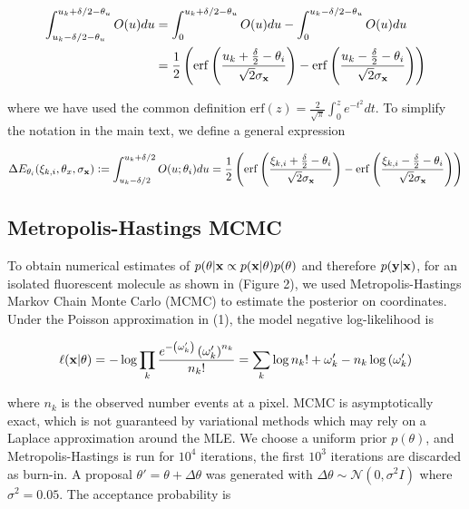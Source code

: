 \documentclass{article}
\begin{document}
\begin{align*}
\int_{u_{k}-\delta /2 - \theta_{u}}^{u_{k}+\delta /2 - \theta_{u}} O(u)du &= \int_{0}^{u_{k}+\delta /2 - \theta_{u}} O(u)du - \int_{0}^{u_{k}-\delta /2 - \theta_{u}} O(u)du\\
&= \frac{1}{2}\left(\mathrm{erf}\left(\frac{u_{k}+\frac{\delta}{2}-\theta_{i}}{\sqrt{2}\sigma_{\bold{x}}}\right) -\mathrm{erf}\left(\frac{u_{k}-\frac{\delta}{2}-\theta_{i}}{\sqrt{2}\sigma_{\bold{x}}}\right)\right)
\end{align*}

where we have used the common definition $\mathrm{erf}(z) = \frac{2}{\sqrt{\pi}}\int_{0}^{z}e^{-t^{2}}dt$. To simplify the notation in the main text, we define a general expression

\begin{equation*}
\Delta E_{\theta_{i}}(\xi_{k,i},\theta_{x},\sigma_{\bold{x}}) \vcentcolon = \int_{u_{k}-\delta /2}^{u_{k}+\delta /2} O(u;\theta_{i})du = \frac{1}{2}\left(\mathrm{erf}\left(\frac{\xi_{k,i}+\frac{\delta}{2}-\theta_{i}}{\sqrt{2}\sigma_{\bold{x}}}\right) -\mathrm{erf}\left(\frac{\xi_{k,i}-\frac{\delta}{2}-\theta_{i}}{\sqrt{2}\sigma_{\bold{x}}}\right)\right)
\end{equation*}

\subsection{Metropolis-Hastings MCMC}

To obtain numerical estimates of $p(\theta|\bold{x}\propto p(\bold{x}|\theta)p(\theta)$ and therefore $p(\bold{y}|\bold{x})$, for an isolated fluorescent molecule as shown in (Figure 2), we used Metropolis-Hastings Markov Chain Monte Carlo (MCMC) to estimate the posterior on coordinates. Under the Poisson approximation in (1), the model negative log-likelihood is

\begin{equation}
\ell(\bold{x}|\theta) = -\log \prod_{k} \frac{e^{-\left(\omega_{k}'\right)}\left(\omega_{k}'\right)^{n_{k}}}{n_{k}!} = \sum_{k}  \log n_{k}! + \omega_{k}' - n_{k}\log\left(\omega_{k}'\right)
\end{equation}

where $n_{k}$ is the observed number events at a pixel. MCMC is asymptotically exact, which is not guaranteed by variational methods which may rely on a Laplace approximation around the MLE. We choose a uniform prior $p(\theta)$, and Metropolis-Hastings is run for $10^4$ iterations, the first $10^{3}$ iterations are discarded as burn-in. A proposal $\theta' = \theta + \Delta\theta$ was generated with $\Delta\theta \sim \mathcal{N}(0,\sigma^{2}I)$ where $\sigma^{2}=0.05$. The acceptance probability is
\end{document}
